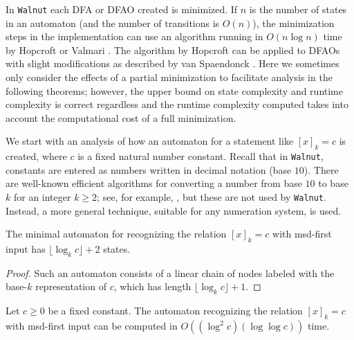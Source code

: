 \documentclass[12pt,reqno]{article}
\begin{document}
In {\tt Walnut} each DFA or DFAO created is minimized. If $n$ is the number of states in an automaton (and the number of transitions is $O(n)$), the minimization steps in the implementation can use an algorithm running in $O(n \log n)$ time  by Hopcroft \cite{hopcroft_n_1971} or Valmari \cite{valmari_fast_2012}. The algorithm by Hopcroft can be applied to DFAOs with slight modifications as described by van Spaendonck \cite{van_spaendonck_automatic_2020}.  
Here we sometimes only consider the effects of a partial minimization to facilitate analysis in the following theorems; however, the upper bound on state complexity and runtime complexity is correct regardless and the runtime complexity computed takes into account the computational cost of a full minimization.

We start with an analysis of how an automaton for a statement like $[x]_k = c$ is created, where $c$ is a fixed natural number constant.  Recall that in {\tt Walnut}, constants are entered as numbers written in decimal notation (base $10$).
There are well-known efficient algorithms for converting a number from base $10$ to base $k$ for an integer $k \geq 2$; see, for example, \cite[\S 4.4]{knuth_seminumerical_1997}, but these are not used by {\tt Walnut}. Instead, a more general technique, suitable for any numeration system, is used.

\begin{lemma} \label{lemma:=c-sc}
The minimal automaton for recognizing the relation
$[x]_k = c$ with msd-first input has $\lfloor \log_k c \rfloor + 2$ states. 
\end{lemma}

\begin{proof}
Such an automaton consists of a linear chain of nodes labeled with the base-$k$ representation of $c$, which has
length $\lfloor \log_k c \rfloor + 1$.  
\end{proof}


\begin{theorem} \label{theorem:=c}
    Let $c \geq 0$ be a fixed constant. The automaton recognizing the relation $[x]_k = c$ with msd-first input can be computed in $ O((\log^2  c) (\log \log c))$ time.
\end{theorem}
\end{document}
